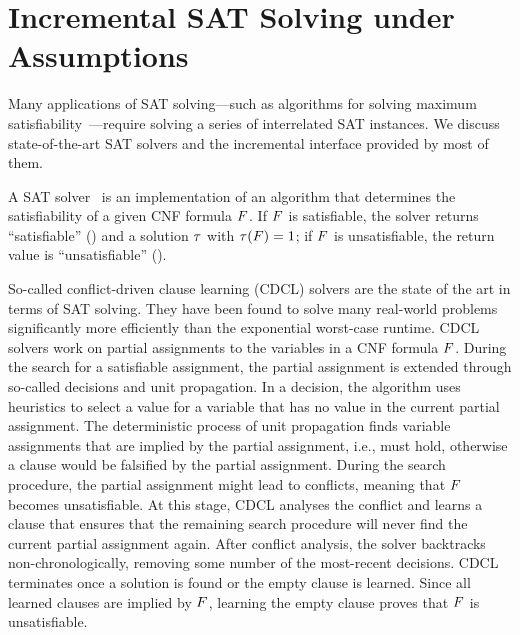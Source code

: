 \section{Incremental SAT Solving under Assumptions\label{sec:inc-sat}}

Many applications of SAT solving---such as algorithms for solving maximum satisfiability~\autocite{handbook2-maxsat}---require solving a series of interrelated SAT instances.
We discuss state-of-the-art SAT solvers and the incremental interface provided by most of them.

A SAT solver~\autocite{handbook2-cdcl} is an implementation of an algorithm that determines the satisfiability of a given CNF formula $F$.
If $F$ is satisfiable, the solver returns ``satisfiable'' (\sat{}) and a solution $\tau$ with $\tau(F)=1$;
if $F$ is unsatisfiable, the return value is ``unsatisfiable'' (\unsat{}).

So-called conflict-driven clause learning (CDCL) solvers are the state of the art in terms of SAT solving.
They have been found to solve many real-world problems significantly more efficiently than the exponential worst-case runtime.
CDCL solvers work on partial assignments to the variables in a CNF formula $F$.
During the search for a satisfiable assignment, the partial assignment is extended through so-called decisions and unit propagation.
In a decision, the algorithm uses heuristics to select a value for a variable that has no value in the current partial assignment.
The deterministic process of unit propagation finds variable assignments that are implied by the partial assignment, i.e., must hold, otherwise a clause would be falsified by the partial assignment.
During the search procedure, the partial assignment might lead to conflicts, meaning that $F$ becomes unsatisfiable.
At this stage, CDCL analyses the conflict and learns a clause that ensures that the remaining search procedure will never find the current partial assignment again.
After conflict analysis, the solver backtracks non-chronologically, removing some number of the most-recent decisions.
CDCL terminates once a solution is found or the empty clause is learned.
Since all learned clauses are implied by $F$, learning the empty clause proves that $F$ is unsatisfiable.

